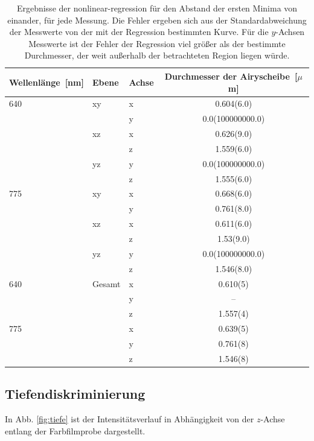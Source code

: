\begin{table}
	\centering
	\caption{Ergebnisse der nonlinear-regression für den Abstand der ersten Minima von einander, für jede Messung.
	Die Fehler ergeben sich aus der Standardabweichung der Messwerte von der mit der Regression bestimmten Kurve.
Für die $y$-Achsen Messwerte ist der Fehler der Regression viel größer als der bestimmte Durchmesser, der weit außerhalb der betrachteten Region liegen würde. }
	\begin{tabular}{l|l|l|c}
		Wellenlänge~[nm] & Ebene & Achse & Durchmesser der Airyscheibe~[$\mu$m] \\ \hline 
		640 & xy & x  &  0.604(6.0)\\ 
		 &  & y  &  0.0(100000000.0)\\ 
		 & xz & x  &  0.626(9.0)\\ 
		 &  & z  &  1.559(6.0)\\ 
		 & yz & y  &  0.0(100000000.0)\\ 
		 &  & z  &  1.555(6.0)\\ 
		775 & xy & x  &  0.668(6.0)\\ 
		 &  & y  &  0.761(8.0)\\ 
		 & xz & x  &  0.611(6.0)\\ 
		 &  & z  &  1.53(9.0)\\ 
		 & yz & y  &  0.0(100000000.0)\\ 
		 &  & z  &  1.546(8.0)\\ \hline
		640 &Gesamt & x & 0.610(5)\\
		    &	&y& --\\ 
		    &	&z& 1.557(4)\\
		775 &	&x& 0.639(5)\\
		    &	&y& 0.761(8)\\
		    &	&z& 1.546(8)\\
	\end{tabular}\label{tab:psffits}

\end{table}

\subsection{Tiefendiskriminierung}
In Abb. \ref{fig:tiefe} ist der Intensitätsverlauf in Abhängigkeit von der $z$-Achse entlang der Farbfilmprobe dargestellt.

